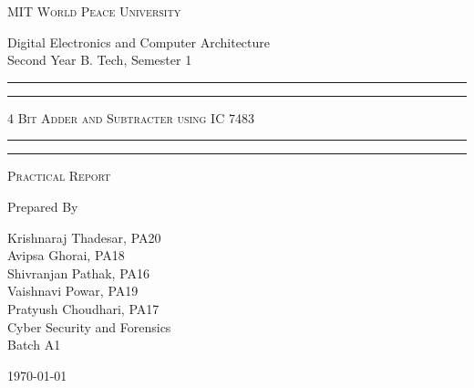 \documentclass[11pt]{article}
\begin{document}
\begin{titlepage}
	\centering


	\huge\textsc{
		MIT World Peace University
	}\\

	\vspace{0.75\baselineskip} %

	\LARGE{
		Digital Electronics and Computer Architecture\\
		Second Year B. Tech, Semester 1
	}

	\vfill %


	\rule{\textwidth}{1.6pt}\vspace*{-\baselineskip}\vspace*{2pt}
	\rule{\textwidth}{0.6pt}
	\vspace{0.75\baselineskip} %



	\huge{\textsc{
			4 Bit Adder and Subtracter using IC 7483
		}} \\



	\vspace{0.5\baselineskip} %
	\rule{\textwidth}{0.6pt}\vspace*{-\baselineskip}\vspace*{2.8pt}
	\rule{\textwidth}{1.6pt}

	\vspace{1\baselineskip} %


	\LARGE\textsc{
		Practical Report
	} %
	\vfill


	Prepared By
	\vspace{0.5\baselineskip} %

	\Large{
		Krishnaraj Thadesar, PA20 \\
		Avipsa Ghorai, PA18\\
		Shivranjan Pathak, PA16\\
		Vaishnavi Powar, PA19\\
		Pratyush Choudhari, PA17\\
		Cyber Security and Forensics\\
		Batch A1
	}


	\vspace{0.5\baselineskip} %
	\today

\end{titlepage}
\end{document}
